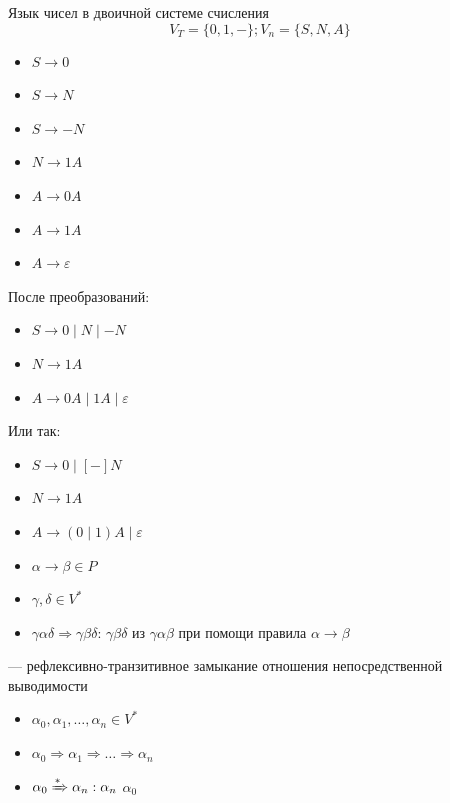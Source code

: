 \documentclass[a4paper, 14pt]{extarticle}
\begin{document}
\begin{example}{Язык чисел в двоичной системе счисления}
    \[ V_T = \{ 0, 1, - \}; V_n = \{ S, N, A \} \]
    \begin{itemize}
        \item $S \rightarrow0$
        \item $S \rightarrow N$
        \item $S \rightarrow -N$
        \item $ N \rightarrow 1A $
        \item $ A \rightarrow 0A $
        \item $ A \rightarrow 1A $
        \item $ A \rightarrow \varepsilon $
    \end{itemize}
    После преобразований:
    \begin{itemize}
        \item $ S \rightarrow 0 \mid N \mid -N $
        \item $ N \rightarrow 1A $
        \item $ A \rightarrow 0A \mid 1A \mid \varepsilon $
    \end{itemize}
    Или так:
    \begin{itemize}
        \item $ S \rightarrow 0 \mid [-]N $
        \item $ N \rightarrow 1A $
        \item $ A \rightarrow (0 \mid 1)A \mid \varepsilon $
    \end{itemize}
\end{example}

\begin{itemize}
    \item $\alpha \rightarrow \beta \in P$
    \item $\gamma, \delta \in V^*$
    \item $ \gamma\alpha\delta \Rightarrow \gamma\beta\delta $: $ \gamma\beta\delta $  из $\gamma\alpha\beta$ при помощи правила $ \alpha \rightarrow \beta$
\end{itemize}

 --- рефлексивно-транзитивное замыкание отношения непосредственной выводимости
\begin{itemize}
    \item $\alpha_0, \alpha_1, \ldots, \alpha_n \in V^*$
    \item $\alpha_0 \Rightarrow \alpha_1 \Rightarrow \ldots \Rightarrow \alpha_n$
    \item $ \alpha_0 \xRightarrow{*} \alpha_n: \alpha_n $  $\alpha_0$
\end{itemize}
\end{document}
